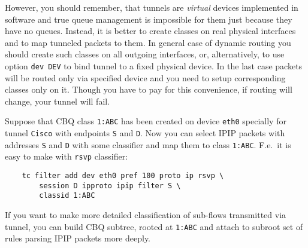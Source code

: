 However, you should remember, that tunnels are {\em virtual} devices
implemented in software and true queue management is impossible for them
just because they have no queues. Instead, it is better to create classes
on real physical interfaces and to map tunneled packets to them.
In general case of dynamic routing you should create such classes
on all outgoing interfaces, or, alternatively,
to use option \verb|dev DEV| to bind tunnel to a fixed physical device.
In the last case packets will be routed only via specified device
and you need to setup corresponding classes only on it.
Though you have to pay for this convenience,
if routing will change, your tunnel will fail.

Suppose that CBQ class \verb|1:ABC| has been created on device \verb|eth0| 
specially for tunnel \verb|Cisco| with endpoints \verb|S| and \verb|D|.
Now you can select IPIP packets with addresses \verb|S| and \verb|D|
with some classifier and map them to class \verb|1:ABC|. F.e.\ 
it is easy to make with \verb|rsvp| classifier:
\begin{verbatim}
    tc filter add dev eth0 pref 100 proto ip rsvp \
        session D ipproto ipip filter S \
        classid 1:ABC
\end{verbatim}

If you want to make more detailed classification of sub-flows
transmitted via tunnel, you can build CBQ subtree,
rooted at \verb|1:ABC| and attach to subroot set of rules parsing
IPIP packets more deeply.


